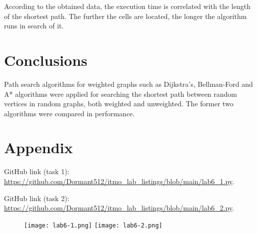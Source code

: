 \documentclass[12pt, a4paper]{article}
\begin{document}
According to the obtained data, the execution time is correlated with the length of the shortest path. The further the cells are located, the longer the algorithm runs in search of it.

\section*{Conclusions}

Path search algorithms for weighted graphs such as Dijkstra's, Bellman-Ford and A* algorithms were applied for searching the shortest path between random vertices in random graphs, both weighted and unweighted. The former two algorithms were compared in performance.

\section*{Appendix}

GitHub link (task 1): \url{https://github.com/Dormant512/itmo_lab_listings/blob/main/lab6_1.py}.

GitHub link (task 2): \url{https://github.com/Dormant512/itmo_lab_listings/blob/main/lab6_2.py}.

\begin{figure}[!h]
\centering
\texttt{[image: lab6-1.png]}
\texttt{[image: lab6-2.png]}
\end{figure}
\end{document}
